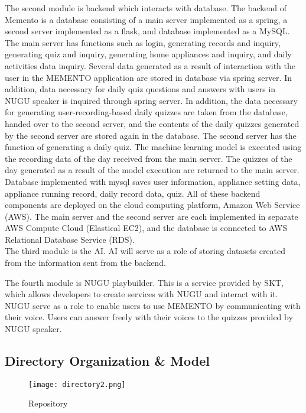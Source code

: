 \documentclass[conference]{IEEEtran}
\begin{document}
\indent The second module is backend which interacts with database. The backend of Memento is a database consisting of a main server implemented as a spring, a second server implemented as a flask, and database implemented as a MySQL. The main server has functions such as login, generating records and inquiry, generating quiz and inquiry, generating home appliances and inquiry, and daily activities data inquiry. Several data generated as a result of interaction with the user in the MEMENTO application are stored in database via spring server. In addition, data necessary for daily quiz questions and answers with users in NUGU speaker is inquired through spring server. In addition, the data necessary for generating user-recording-based daily quizzes are taken from the database, handed over to the second server, and the contents of the daily quizzes generated by the second server are stored again in the database. The second server has the function of generating a daily quiz. The machine learning model is executed using the recording data of the day received from the main server. The quizzes of the day generated as a result of the model execution are returned to the main server. Database implemented with mysql saves user information, appliance setting data, appliance running record, daily record data, quiz. All of these backend components are deployed on the cloud computing platform, Amazon Web Service (AWS). The main server and the second server are each implemented in separate AWS Compute Cloud (Elastical EC2), and the database is connected to AWS Relational Database Service (RDS).\\

\indent The third module is the AI. AI will serve as a role of storing datasets created from the information sent from the backend.

\indent The fourth module is NUGU playbuilder. This is a service provided by SKT, which allows developers to create services with NUGU and interact with it. NUGU serve as a role to enable users to use MEMENTO by communicating with their voice. Users can answer freely with their voices to the quizzes provided by NUGU speaker. 

\subsection{Directory Organization \& Model}
\begin{figure}[h]
\centerline{\texttt{[image: directory2.png]}}
\caption{Repository}
\label{fig}
\end{figure}
\end{document}
